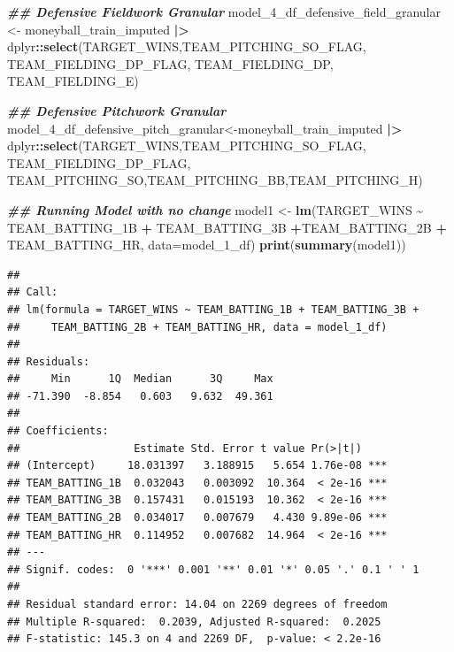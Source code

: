 \documentclass[
]{article}
\newenvironment{Shaded}{\begin{snugshade}}{\end{snugshade}}
\newcommand{\AttributeTok}[1]{\textcolor[rgb]{0.13,0.29,0.53}{#1}}
\newcommand{\DocumentationTok}[1]{\textcolor[rgb]{0.56,0.35,0.01}{\textbf{\textit{#1}}}}
\newcommand{\FunctionTok}[1]{\textcolor[rgb]{0.13,0.29,0.53}{\textbf{#1}}}
\newcommand{\NormalTok}[1]{#1}
\newcommand{\OtherTok}[1]{\textcolor[rgb]{0.56,0.35,0.01}{#1}}
\newcommand{\SpecialCharTok}[1]{\textcolor[rgb]{0.81,0.36,0.00}{\textbf{#1}}}
\begin{document}
\begin{Shaded}
\begin{Highlighting}[]
\DocumentationTok{\#\# Defensive Fieldwork Granular}
\NormalTok{model\_4\_df\_defensive\_field\_granular }\OtherTok{\textless{}{-}}\NormalTok{ moneyball\_train\_imputed }\SpecialCharTok{|\textgreater{}} 
\NormalTok{  dplyr}\SpecialCharTok{::}\FunctionTok{select}\NormalTok{(TARGET\_WINS,TEAM\_PITCHING\_SO\_FLAG, TEAM\_FIELDING\_DP\_FLAG, }
\NormalTok{         TEAM\_FIELDING\_DP, TEAM\_FIELDING\_E)}

\DocumentationTok{\#\# Defensive Pitchwork Granular}
\NormalTok{model\_4\_df\_defensive\_pitch\_granular}\OtherTok{\textless{}{-}}\NormalTok{moneyball\_train\_imputed }\SpecialCharTok{|\textgreater{}} 
\NormalTok{  dplyr}\SpecialCharTok{::}\FunctionTok{select}\NormalTok{(TARGET\_WINS,TEAM\_PITCHING\_SO\_FLAG, TEAM\_FIELDING\_DP\_FLAG, }
\NormalTok{         TEAM\_PITCHING\_SO,TEAM\_PITCHING\_BB,TEAM\_PITCHING\_H)}
\end{Highlighting}
\end{Shaded}

\begin{Shaded}
\begin{Highlighting}[]
\DocumentationTok{\#\# Running Model with no change}
\NormalTok{model1 }\OtherTok{\textless{}{-}} \FunctionTok{lm}\NormalTok{(TARGET\_WINS }\SpecialCharTok{\textasciitilde{}}\NormalTok{ TEAM\_BATTING\_1B }\SpecialCharTok{+}\NormalTok{ TEAM\_BATTING\_3B }\SpecialCharTok{+}\NormalTok{TEAM\_BATTING\_2B }\SpecialCharTok{+}\NormalTok{ TEAM\_BATTING\_HR, }\AttributeTok{data=}\NormalTok{model\_1\_df)}
\FunctionTok{print}\NormalTok{(}\FunctionTok{summary}\NormalTok{(model1))}
\end{Highlighting}
\end{Shaded}

\begin{verbatim}
## 
## Call:
## lm(formula = TARGET_WINS ~ TEAM_BATTING_1B + TEAM_BATTING_3B + 
##     TEAM_BATTING_2B + TEAM_BATTING_HR, data = model_1_df)
## 
## Residuals:
##     Min      1Q  Median      3Q     Max 
## -71.390  -8.854   0.603   9.632  49.361 
## 
## Coefficients:
##                  Estimate Std. Error t value Pr(>|t|)    
## (Intercept)     18.031397   3.188915   5.654 1.76e-08 ***
## TEAM_BATTING_1B  0.032043   0.003092  10.364  < 2e-16 ***
## TEAM_BATTING_3B  0.157431   0.015193  10.362  < 2e-16 ***
## TEAM_BATTING_2B  0.034017   0.007679   4.430 9.89e-06 ***
## TEAM_BATTING_HR  0.114952   0.007682  14.964  < 2e-16 ***
## ---
## Signif. codes:  0 '***' 0.001 '**' 0.01 '*' 0.05 '.' 0.1 ' ' 1
## 
## Residual standard error: 14.04 on 2269 degrees of freedom
## Multiple R-squared:  0.2039, Adjusted R-squared:  0.2025 
## F-statistic: 145.3 on 4 and 2269 DF,  p-value: < 2.2e-16
\end{verbatim}
\end{document}
